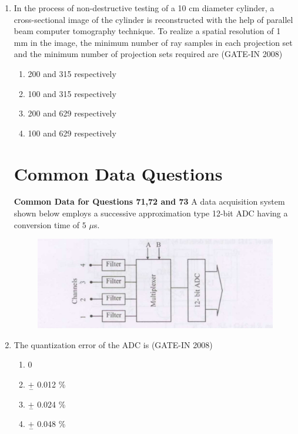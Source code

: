 \documentclass[journal,12pt,onecolumn]{IEEEtran}
\theoremstyle{remark}
\begin{document}
\begin{enumerate}
\item In the process of non-destructive testing of a 10 cm diameter cylinder, a cross-sectional  image of the cylinder is reconstructed with the help of parallel beam computer tomography
technique. To realize a spatial resolution of 1 mm in the image, the minimum number of ray
samples in each projection set and the minimum number of projection sets required are \hfill{(GATE-IN 2008)}
\begin{multicols}{2}
           \begin{enumerate} 
              \item  200 and 315 respectively          
              \item  100 and 315 respectively
              \item  200 and 629 respectively
              \item  100 and 629 respectively
            \end{enumerate}
            \end{multicols}


\section*{Common Data Questions}
\textbf{Common Data for Questions 71,72 and 73}
A data acquisition system  shown below  employs a successive 
approximation type 12-bit ADC having a conversion time of $5$ $\mu$s.

\begin{figure}[H]
    \centering
    \includegraphics[width=0.5\columnwidth]{figs/i32.jpg}
    \caption{}
    \label{fig:placeholder32}
\end{figure}


            

\item The quantization error of the ADC is \hfill{(GATE-IN 2008)}
\begin{multicols}{4}
           \begin{enumerate} 
              \item 0           
              \item $\underset{-}{+}$ 0.012 \%
              \item $\underset{-}{+}$ 0.024 \%
              \item $\underset{-}{+}$ 0.048 \%
            \end{enumerate}
            \end{multicols}


\end{enumerate}
\end{document}
